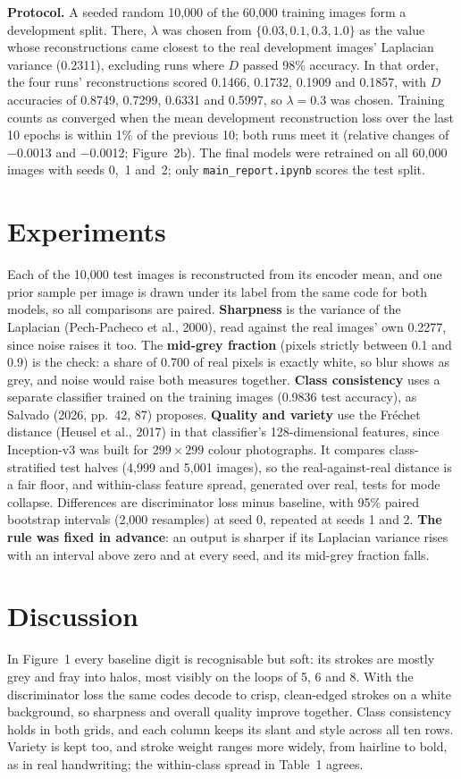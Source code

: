 \documentclass[10pt,a4paper,twocolumn]{article}
\begin{document}
\textbf{Protocol.} A seeded random 10,000 of the 60,000 training images form a development split.
There, $\lambda$ was chosen from $\{0.03, 0.1, 0.3, 1.0\}$ as the value whose reconstructions came closest
to the real development images' Laplacian variance (0.2311), excluding runs where $D$ passed 98\%
accuracy. In that order, the four runs' reconstructions scored 0.1466, 0.1732, 0.1909 and 0.1857, with $D$ accuracies of 0.8749, 0.7299, 0.6331 and 0.5997, so $\lambda = 0.3$ was chosen. Training counts as converged when the mean development reconstruction
loss over the last 10 epochs is within 1\% of the previous 10; both runs meet it (relative changes of $-$0.0013 and $-$0.0012; Figure~2b).
The final models were retrained on all 60,000 images with seeds 0,~1 and~2; only
\texttt{main\_report.ipynb} scores the test split.

\section{Experiments}
Each of the 10,000 test images is reconstructed from its encoder mean, and one prior sample
per image is drawn under its label from the same code for both models, so all comparisons are
paired. \textbf{Sharpness} is the variance of the Laplacian (Pech-Pacheco et al., 2000), read
against the real images' own 0.2277, since noise raises it too. The \textbf{mid-grey
fraction} (pixels strictly between 0.1 and 0.9) is the check: a share of 0.700 of real
pixels is exactly white, so blur shows as grey, and noise would raise both measures together.
\textbf{Class consistency} uses a separate classifier trained on the training images
(0.9836 test accuracy), as Salvado (2026, pp.~42, 87) proposes. \textbf{Quality and
variety} use the Fr\'echet distance (Heusel et al., 2017) in that classifier's 128-dimensional
features, since Inception-v3 was built for $299\times299$ colour photographs. It compares
class-stratified test halves (4,999 and 5,001 images), so the real-against-real distance
is a fair floor, and within-class feature spread, generated over real, tests for mode collapse.
Differences are discriminator loss minus baseline, with 95\% paired bootstrap intervals (2,000
resamples) at seed 0, repeated at seeds 1 and 2. \textbf{The rule was fixed in advance}: an output
is sharper if its Laplacian variance rises with an interval above zero and at every seed, and its
mid-grey fraction falls.

\section{Discussion}
In Figure~1 every baseline digit is recognisable but soft: its strokes are mostly grey and fray into
halos, most visibly on the loops of 5, 6 and 8. With the discriminator loss the same codes decode to
crisp, clean-edged strokes on a white background, so sharpness and overall quality improve together. Class
consistency holds in both grids, and each column keeps its slant and style across all ten rows.
Variety is kept too, and stroke weight ranges more widely, from hairline to bold, as in real
handwriting; the within-class spread in Table~1 agrees.
\end{document}
